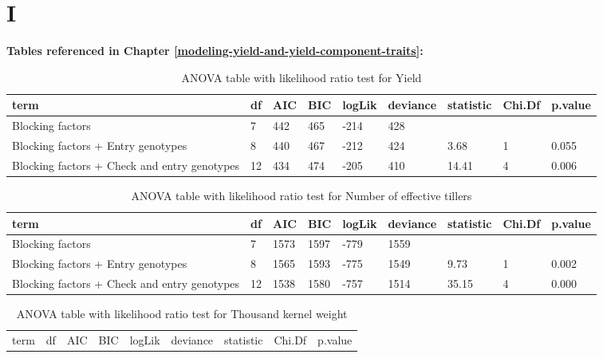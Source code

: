 \documentclass[12pt,oneside]{dukestatscithesis} %
\theoremstyle{definition}
\theoremstyle{definition}
\theoremstyle{definition}
\theoremstyle{remark}
\begin{document}
\appendix

\chapter{I}\label{i}

\textbf{Tables referenced in Chapter
\ref{modeling-yield-and-yield-component-traits}:}
\begin{table}[H]

\caption{\label{tab:unnamed-chunk-3}\label{tab:lrt-yield}ANOVA table with likelihood ratio test for Yield}
\centering
\begin{tabular}[t]{>{\raggedright\arraybackslash}p{3.5cm}llllllll}
\toprule
term & df & AIC & BIC & logLik & deviance & statistic & Chi.Df & p.value\\
\midrule
Blocking factors & 7 & 442 & 465 & -214 & 428 &  &  & \\
Blocking factors + Entry genotypes & 8 & 440 & 467 & -212 & 424 & 3.68 & 1 & 0.055\\
Blocking factors + Check and entry genotypes & 12 & 434 & 474 & -205 & 410 & 14.41 & 4 & 0.006\\
\bottomrule
\end{tabular}
\end{table}\begin{table}[H]
\caption{\label{tab:unnamed-chunk-3}\label{tab:lrt-netill}ANOVA table with likelihood ratio test for Number of effective tillers}
\centering
\begin{tabular}[t]{>{\raggedright\arraybackslash}p{3.5cm}llllllll}
\toprule
term & df & AIC & BIC & logLik & deviance & statistic & Chi.Df & p.value\\
\midrule
Blocking factors & 7 & 1573 & 1597 & -779 & 1559 &  &  & \\
Blocking factors + Entry genotypes & 8 & 1565 & 1593 & -775 & 1549 & 9.73 & 1 & 0.002\\
Blocking factors + Check and entry genotypes & 12 & 1538 & 1580 & -757 & 1514 & 35.15 & 4 & 0.000\\
\bottomrule
\end{tabular}
\end{table}\begin{table}[H]
\caption{\label{tab:unnamed-chunk-3}\label{tab:lrt-tkw}ANOVA table with likelihood ratio test for Thousand kernel weight}
\centering
\begin{tabular}[t]{>{\raggedright\arraybackslash}p{3.5cm}llllllll}
\toprule
term & df & AIC & BIC & logLik & deviance & statistic & Chi.Df & p.value\\

\end{tabular}
\end{table}
\end{document}
